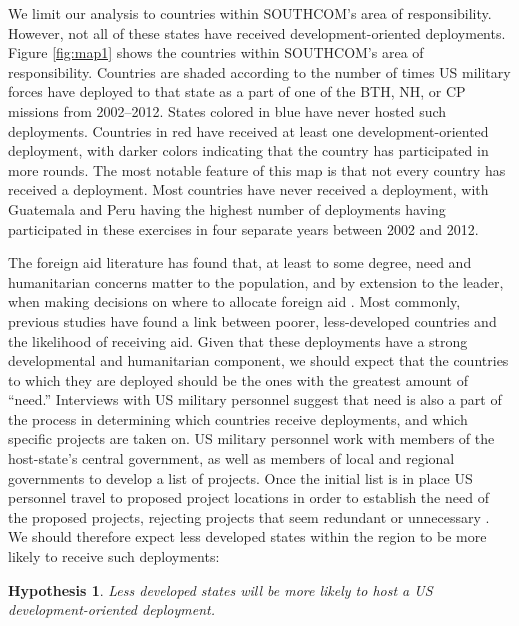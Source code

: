 \documentclass[12pt]{article}
\newtheorem{hyp}{Hypothesis}
\begin{document}
\begin{doublespace}
We limit our analysis to countries within SOUTHCOM's area of responsibility. However, not all of these states have received development-oriented deployments. Figure \ref{fig:map1} shows the countries within SOUTHCOM's area of responsibility. Countries are shaded according to the number of times US military forces have deployed to that state as a part of one of the BTH, NH, or CP missions from 2002--2012. States colored in blue have never hosted such deployments. Countries in red have received at least one development-oriented deployment, with darker colors indicating that the country has participated in more rounds. The most notable feature of this map is that not every country has received a deployment. Most countries have never received a deployment, with Guatemala and Peru having the highest number of deployments having participated in these exercises in four separate years between 2002 and 2012.
 
The foreign aid literature has found that, at least to some degree, need and humanitarian concerns matter to the population, and by extension to the leader, when making decisions on where to allocate foreign aid \cite{AlesinaDollar2000,drury2005politics,lumsdaine1993moral,van2004media}. Most commonly, previous studies have found a link between poorer, less-developed countries and the likelihood of receiving aid. Given that these deployments have a strong developmental and humanitarian component, we should expect that the countries to which they are deployed should be the ones with the greatest amount  of ``need.'' Interviews with US military personnel suggest that need is also a part of the process in determining which countries receive deployments, and which specific projects are taken on. US military personnel work with members of the host-state's central government, as well as members of local and regional governments to develop a list of projects. Once the initial list is in place US personnel travel to proposed project locations in order to establish the need of the proposed projects, rejecting projects that seem redundant or unnecessary \cite{CPT20160309}.  We should therefore expect less developed states within the region to be more likely to receive such deployments: 

\begin{hyp}
Less developed states will be more likely to host a US development-oriented deployment.
\end{hyp}


\end{doublespace}
\end{document}
